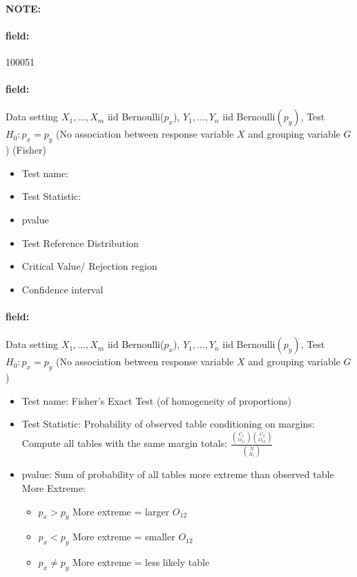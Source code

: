 \documentclass[12pt]{article}
\newenvironment{note}{\paragraph{NOTE:}}{}
\newenvironment{field}{\paragraph{field:}}{}
\begin{document}
\begin{note} \begin{field} \tiny 100051 \end{field}
 \begin{field}
  Data setting $X_1, \ldots , X_m$ iid Bernoulli($p_x$), $Y_1, \ldots, Y_n$ iid Bernoulli$(p_y)$, Test $H_0: p_x = p_y $ (No association between response variable $X$ and grouping variable $G$) (Fisher)
  \begin{itemize}
   \item Test name:
   \item Test Statistic:
   \item pvalue
   \item Test Reference Distribution
   \item Critical Value/ Rejection region
   \item Confidence interval
  \end{itemize}
 \end{field}
 \begin{field}
  Data setting $X_1, \ldots , X_m$ iid Bernoulli($p_x$), $Y_1, \ldots, Y_n$ iid Bernoulli$(p_y)$, Test $H_0: p_x = p_y $ (No association between response variable $X$ and grouping variable $G$)
  \begin{itemize}
   \item Test name: Fisher's Exact Test (of homogeneity of proportions)
   \item Test Statistic: Probability of observed table conditioning on margins: Compute all tables with the same margin totals: $\frac{\binom{C_1}{O_{11}}\binom{C_2}{O_{12}}}{\binom{N}{R_1}}$
   \item pvalue: Sum of probability of all tables more extreme than observed table
         More Extreme:
         \begin{itemize}
          \item $p_x > p_y$ More extreme = larger $O_{12}$
          \item $p_x < p_y$ More extreme = smaller $O_{12}$
          \item $p_x \neq p_y$ More extreme = less likely table
         \end{itemize}
  \end{itemize}
 \end{field}
\end{note}
\end{document}
